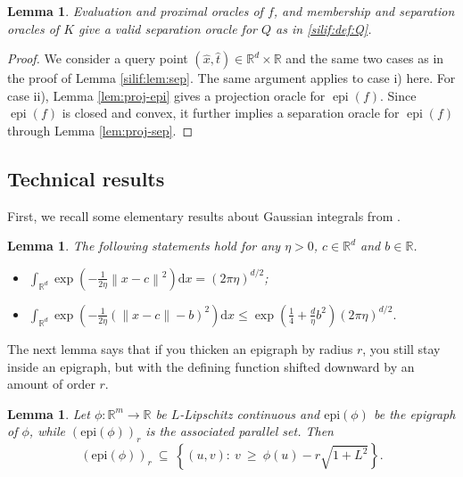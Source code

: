 \documentclass[11pt,letterpaper]{article}
\newcommand{\R}{\mathbb{R}}
\newcommand{\norm}[1]{\left\lVert #1 \right\rVert}
\newcommand{\epi}{\operatorname{epi}}
\newcommand{\D}{\mathrm{d}}
\newcommand{\brac}[1]{\left( #1\right)}
\newtheorem{lemma}[thm]{Lemma}
\begin{document}
\begin{lemma}\label{silif:lem:sep2}
    Evaluation and proximal oracles of $f$, and membership and separation oracles of $K$ give a valid separation oracle for $Q$ as in \eqref{silif:def:Q}.
\end{lemma}

\begin{proof}
    We consider a query point $(\hat x,\hat t) \in \R^d \times \R$ and the same two cases as in the proof of Lemma \ref{silif:lem:sep}.
    The same argument applies to case i) here. For case ii), Lemma \ref{lem:proj-epi} gives a projection oracle for $\epi(f)$. Since $\epi(f)$ is closed and convex, it further implies a separation oracle for $\epi(f)$ through Lemma \ref{lem:proj-sep}.
\end{proof}


\subsection{Technical results}
\label{appen:generaltechnical}

First, we recall some elementary results about Gaussian integrals from \cite[Lemma~A.1]{dangliang2025oracle}. 


\begin{lemma}\label{lem:gaussianint}
The following statements hold for any $\eta>0$, $c\in \R^d$ and $b\in \R$.
\begin{itemize}
    \item[(a)] $ \int_{\R^d} \exp\brac{-\frac{1}{2\eta} \norm{x-c}^2} \D x=(2\pi \eta)^{d/2}$;

    \item[(b)] $ \int_{\R^d} \exp\left(-\frac{1}{2\eta}(\|x-c\|-b)^2\right) \D x
    \le \exp \left(\frac14 + \frac{d}{\eta}b^2\right)(2\pi\eta)^{d/2}.$

\end{itemize} 
\end{lemma}








The next lemma says that if you thicken an epigraph by radius $r$, you still stay inside an epigraph, but with the defining function shifted downward by an amount of order $r$.

\begin{lemma}  
\label{lem:parallelsetcontainment} Let $\phi:\R^{m}\to\R$ be $L$-Lipschitz continuous and $\mathrm{epi}(\phi)$ be the epigraph of $\phi$, while $(\mathrm{epi}(\phi))_r$ is the associated parallel set. Then
\[
(\mathrm{epi}(\phi))_r\ \subseteq\ \left\{(u,v):\ v\ \ge\ \phi(u)-r\sqrt{1+L^2}\right\}.
\]
\end{lemma}
\end{document}
